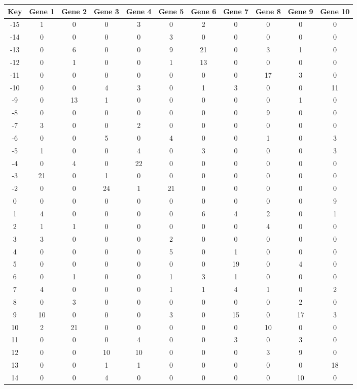 \begin{tabular}{|c|c|c|c|c|c|c|c|c|c|c|}
\hline
Key & Gene 1 & Gene 2 & Gene 3 & Gene 4 & Gene 5 & Gene 6 & Gene 7 & Gene 8 & Gene 9 & Gene 10 \\
\hline
-15 & 1 & 0 & 0 & 3 & 0 & 2 & 0 & 0 & 0 & 0 \\
-14 & 0 & 0 & 0 & 0 & 3 & 0 & 0 & 0 & 0 & 0 \\
-13 & 0 & 6 & 0 & 0 & 9 & 21 & 0 & 3 & 1 & 0 \\
-12 & 0 & 1 & 0 & 0 & 1 & 13 & 0 & 0 & 0 & 0 \\
-11 & 0 & 0 & 0 & 0 & 0 & 0 & 0 & 17 & 3 & 0 \\
-10 & 0 & 0 & 4 & 3 & 0 & 1 & 3 & 0 & 0 & 11 \\
-9 & 0 & 13 & 1 & 0 & 0 & 0 & 0 & 0 & 1 & 0 \\
-8 & 0 & 0 & 0 & 0 & 0 & 0 & 0 & 9 & 0 & 0 \\
-7 & 3 & 0 & 0 & 2 & 0 & 0 & 0 & 0 & 0 & 0 \\
-6 & 0 & 0 & 5 & 0 & 4 & 0 & 0 & 1 & 0 & 3 \\
-5 & 1 & 0 & 0 & 4 & 0 & 3 & 0 & 0 & 0 & 3 \\
-4 & 0 & 4 & 0 & 22 & 0 & 0 & 0 & 0 & 0 & 0 \\
-3 & 21 & 0 & 1 & 0 & 0 & 0 & 0 & 0 & 0 & 0 \\
-2 & 0 & 0 & 24 & 1 & 21 & 0 & 0 & 0 & 0 & 0 \\
0 & 0 & 0 & 0 & 0 & 0 & 0 & 0 & 0 & 0 & 9 \\
1 & 4 & 0 & 0 & 0 & 0 & 6 & 4 & 2 & 0 & 1 \\
2 & 1 & 1 & 0 & 0 & 0 & 0 & 0 & 4 & 0 & 0 \\
3 & 3 & 0 & 0 & 0 & 2 & 0 & 0 & 0 & 0 & 0 \\
4 & 0 & 0 & 0 & 0 & 5 & 0 & 1 & 0 & 0 & 0 \\
5 & 0 & 0 & 0 & 0 & 0 & 0 & 19 & 0 & 4 & 0 \\
6 & 0 & 1 & 0 & 0 & 1 & 3 & 1 & 0 & 0 & 0 \\
7 & 4 & 0 & 0 & 0 & 1 & 1 & 4 & 1 & 0 & 2 \\
8 & 0 & 3 & 0 & 0 & 0 & 0 & 0 & 0 & 2 & 0 \\
9 & 10 & 0 & 0 & 0 & 3 & 0 & 15 & 0 & 17 & 3 \\
10 & 2 & 21 & 0 & 0 & 0 & 0 & 0 & 10 & 0 & 0 \\
11 & 0 & 0 & 0 & 4 & 0 & 0 & 3 & 0 & 3 & 0 \\
12 & 0 & 0 & 10 & 10 & 0 & 0 & 0 & 3 & 9 & 0 \\
13 & 0 & 0 & 1 & 1 & 0 & 0 & 0 & 0 & 0 & 18 \\
14 & 0 & 0 & 4 & 0 & 0 & 0 & 0 & 0 & 10 & 0 \\
\hline
\end{tabular}